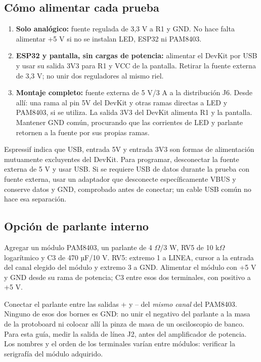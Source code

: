 \documentclass[10pt,a4paper]{article}
\begin{document}
\clearpage
\subsection{Cómo alimentar cada prueba}
\begin{enumerate}
\item \textbf{Solo analógico:} fuente regulada de 3,3 V a R1 y GND. No hace falta alimentar +5 V si no se instalan LED, ESP32 ni PAM8403.
\item \textbf{ESP32 y pantalla, sin cargas de potencia:} alimentar el DevKit por USB y usar su salida 3V3 para R1 y VCC de la pantalla. Retirar la fuente externa de 3,3 V; no unir dos reguladores al mismo riel.
\item \textbf{Montaje completo:} fuente externa de 5 V/3 A a la distribución J6. Desde allí: una rama al pin 5V del DevKit y otras ramas directas a LED y PAM8403, si se utiliza. La salida 3V3 del DevKit alimenta R1 y la pantalla. Mantener GND común, procurando que las corrientes de LED y parlante retornen a la fuente por sus propias ramas.
\end{enumerate}
Espressif indica que USB, entrada 5V y entrada 3V3 son formas de alimentación mutuamente excluyentes del DevKit. Para programar, desconectar la fuente externa de 5 V y usar USB. Si se requiere USB de datos durante la prueba con fuente externa, usar un adaptador que desconecte específicamente VBUS y conserve datos y GND, comprobado antes de conectar; un cable USB común no hace esa separación.

\subsection{Opción de parlante interno}
Agregar un módulo PAM8403, un parlante de 4 \ensuremath{\Omega}/3 W, RV5 de 10 k\ensuremath{\Omega} logarítmico y C3 de 470 µF/10 V. RV5: extremo 1 a LINEA, cursor a la entrada del canal elegido del módulo y extremo 3 a GND. Alimentar el módulo con +5 V y GND desde su rama de potencia; C3 entre esos dos terminales, con positivo a +5 V.

Conectar el parlante entre las salidas + y -- del \emph{mismo canal} del PAM8403. Ninguno de esos dos bornes es GND: no unir el negativo del parlante a la masa de la protoboard ni colocar allí la pinza de masa de un osciloscopio de banco. Para esta guía, medir la salida de línea J2, antes del amplificador de potencia. Los nombres y el orden de los terminales varían entre módulos: verificar la serigrafía del módulo adquirido.
\end{document}
